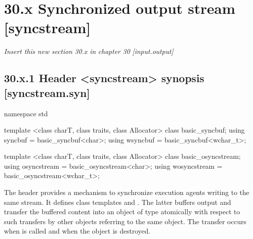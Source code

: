 \documentclass[ebook,11pt,article]{memoir}
\begin{document}
\section{30.x Synchronized output stream [syncstream]}
\emph{Insert this new section 30.x in chapter 30 [input.output] }
\subsection{30.x.1 Header <syncstream> synopsis [syncstream.syn]}
\begin{addedblock}
\begin{codeblock}
namespace std {
template <class charT,
          class traits,
          class Allocator>
  class basic_syncbuf;
using syncbuf  = basic_syncbuf<char>;
using wsyncbuf = basic_syncbuf<wchar_t>;

template <class charT,
          class traits,
          class Allocator>
  class basic_osyncstream;
using osyncstream = basic_osyncstream<char>;
using wosyncstream = basic_osyncstream<wchar_t>; 
}
\end{codeblock}
\end{addedblock}

\begin{addedblock}
\pnum
The header  provides a mechanism to synchronize execution agents writing to the same stream. 
It defines class templates  and . The latter buffers output and transfer the buffered content into an object of type  atomically with respect to such transfers by other  objects referring to the same  object. The transfer occurs when  is called and when the  object is destroyed.
\end{addedblock}

\newpage
\end{document}
